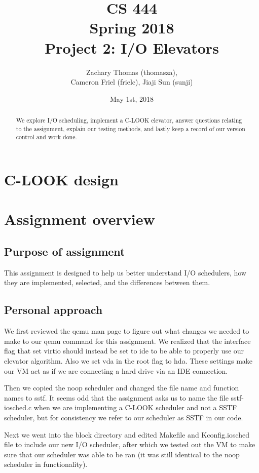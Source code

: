 \documentclass[journal,10pt,onecolumn,letterpaper,draftclsnofoot]{IEEEtran}
\title{CS 444 \\ Spring 2018  \\ Project 2: I/O Elevators}
\author{Zachary Thomas (thomasza),\\ Cameron Friel (frielc), Jiaji Sun (sunji)}
\date{May 1st, 2018}
\begin{document}
\maketitle
\begin{abstract}
We explore I/O scheduling, implement a C-LOOK elevator, answer questions relating to the assignment, explain our testing methods, and lastly keep a record of our version control and work done.
\end{abstract}
    
\newpage
\tableofcontents
\newpage

\section{C-LOOK design}

\section{Assignment overview}

\subsection{Purpose of assignment}
This assignment is designed to help us better understand I/O schedulers, how they are implemented, selected, and the differences between them.

\subsection{Personal approach}

We first reviewed the qemu man page to figure out what changes we needed to make to our qemu command for this assignment. We realized that the interface flag that set virtio should instead be set to ide to be able to properly use our elevator algorithm. Also we set vda in the root flag to hda. These settings make our VM act as if we are connecting a hard drive via an IDE connection.

Then we copied the noop scheduler and changed the file name and function names to sstf. It seems odd that the assignment asks us to name the file sstf-iosched.c when we are implementing a C-LOOK scheduler and not a SSTF scheduler, but for consistency we refer to our scheduler as SSTF in our code.

Next we went into the block directory and edited Makefile and Kconfig.iosched file to include our new I/O scheduler, after which we tested out the VM to make sure that our scheduler was able to be ran (it was still identical to the noop scheduler in functionality).
\end{document}
